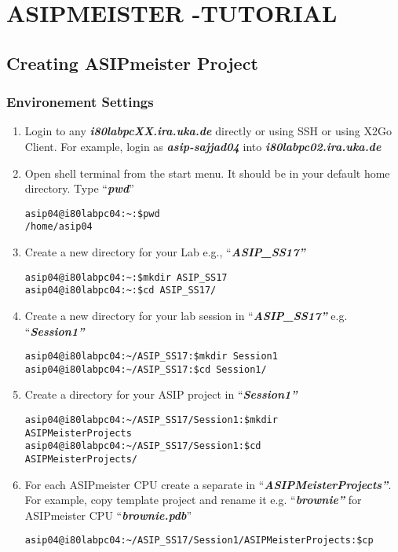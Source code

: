 \chapter*{ASIPMEISTER -TUTORIAL}
\section*{Creating ASIPmeister Project}
\subsection{Environement Settings}
\begin{enumerate}
\item Login to any \emph{\textbf{i80labpcXX.ira.uka.de}} directly or using
	SSH or using X2Go Client. For example, login as \emph{\textbf{asip-sajjad04}} into
	\emph{\textbf{i80labpc02.ira.uka.de}}
\item Open shell terminal from the start menu. It should be in your default
	home directory. Type ``\emph{\textbf{pwd}}''
\begin{lstlisting}
asip04@i80labpc04:~:$pwd
/home/asip04
\end{lstlisting}
\item Create a new directory for your Lab e.g., ``\emph{\textbf{ASIP\_SS17''}}
\begin{lstlisting}
asip04@i80labpc04:~:$mkdir ASIP_SS17
asip04@i80labpc04:~:$cd ASIP_SS17/
\end{lstlisting}
\item Create a new directory for your lab session in
	``\emph{\textbf{ASIP\_SS17''}} e.g. ``\emph{\textbf{Session1''}}
\begin{lstlisting}
asip04@i80labpc04:~/ASIP_SS17:$mkdir Session1
asip04@i80labpc04:~/ASIP_SS17:$cd Session1/
\end{lstlisting}
\item Create a directory for your ASIP project in ``\emph{\textbf{Session1''}}
\begin{lstlisting}
asip04@i80labpc04:~/ASIP_SS17/Session1:$mkdir
ASIPMeisterProjects
asip04@i80labpc04:~/ASIP_SS17/Session1:$cd
ASIPMeisterProjects/
\end{lstlisting}
\item For each ASIPmeister CPU create a separate in
	``\emph{\textbf{ASIPMeisterProjects''}}. For example, copy template
	project and rename it e.g. ``\emph{\textbf{brownie''}} for ASIPmeister
	CPU ``\emph{\textbf{brownie.pdb}}''
\begin{lstlisting}
asip04@i80labpc04:~/ASIP_SS17/Session1/ASIPMeisterProjects:$cp

\end{lstlisting}
\end{enumerate}
